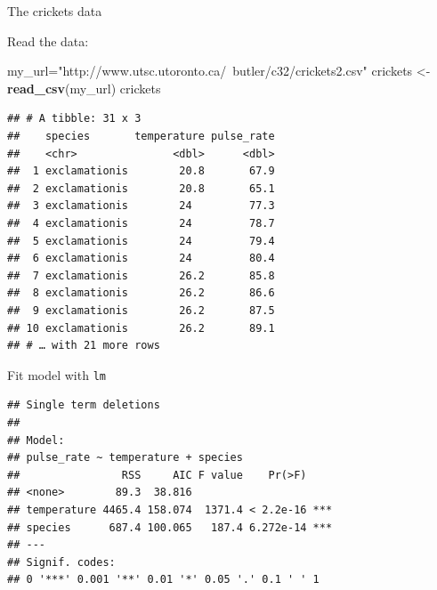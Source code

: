 \documentclass[ignorenonframetext,]{beamer}
\newenvironment{Shaded}{\begin{snugshade}}{\end{snugshade}}
\newcommand{\DataTypeTok}[1]{\textcolor[rgb]{0.13,0.29,0.53}{#1}}
\newcommand{\FloatTok}[1]{\textcolor[rgb]{0.00,0.00,0.81}{#1}}
\newcommand{\KeywordTok}[1]{\textcolor[rgb]{0.13,0.29,0.53}{\textbf{#1}}}
\newcommand{\NormalTok}[1]{#1}
\newcommand{\OperatorTok}[1]{\textcolor[rgb]{0.81,0.36,0.00}{\textbf{#1}}}
\newcommand{\StringTok}[1]{\textcolor[rgb]{0.31,0.60,0.02}{#1}}
\begin{document}
\begin{frame}[fragile]{The crickets data}
\protect\hypertarget{the-crickets-data}{}

Read the data:

\begin{Shaded}
\begin{Highlighting}[]
\NormalTok{my_url=}\StringTok{"http://www.utsc.utoronto.ca/~butler/c32/crickets2.csv"}
\NormalTok{crickets <-}\StringTok{ }\KeywordTok{read_csv}\NormalTok{(my_url)}
\NormalTok{crickets}
\end{Highlighting}
\end{Shaded}

\begin{verbatim}
## # A tibble: 31 x 3
##    species       temperature pulse_rate
##    <chr>               <dbl>      <dbl>
##  1 exclamationis        20.8       67.9
##  2 exclamationis        20.8       65.1
##  3 exclamationis        24         77.3
##  4 exclamationis        24         78.7
##  5 exclamationis        24         79.4
##  6 exclamationis        24         80.4
##  7 exclamationis        26.2       85.8
##  8 exclamationis        26.2       86.6
##  9 exclamationis        26.2       87.5
## 10 exclamationis        26.2       89.1
## # … with 21 more rows
\end{verbatim}

\end{frame}

\begin{frame}[fragile]{Fit model with \texttt{lm}}
\protect\hypertarget{fit-model-with-lm}{}

\begin{Shaded}
\end{Shaded}

\begin{verbatim}
## Single term deletions
## 
## Model:
## pulse_rate ~ temperature + species
##                RSS     AIC F value    Pr(>F)    
## <none>        89.3  38.816                      
## temperature 4465.4 158.074  1371.4 < 2.2e-16 ***
## species      687.4 100.065   187.4 6.272e-14 ***
## ---
## Signif. codes:  
## 0 '***' 0.001 '**' 0.01 '*' 0.05 '.' 0.1 ' ' 1
\end{verbatim}

\end{frame}
\end{document}
